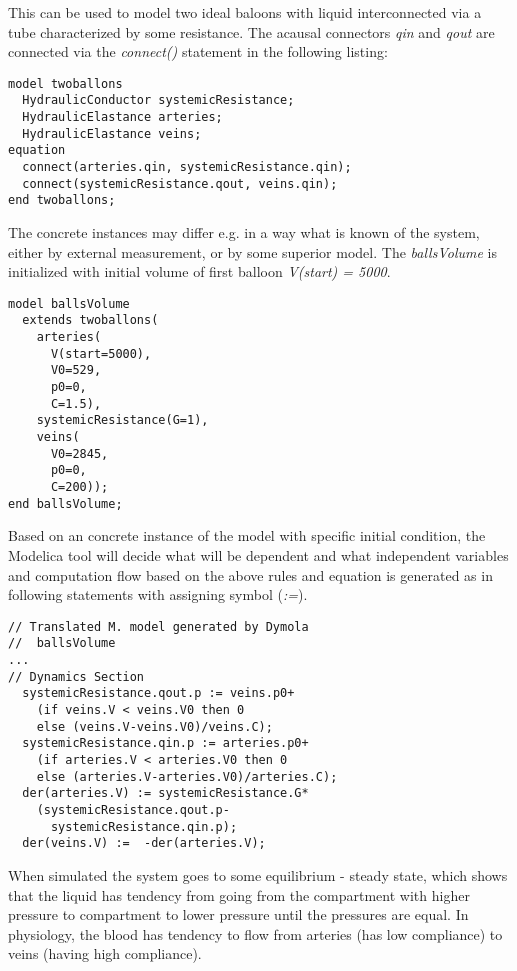 \documentclass[letterpaper, 10 pt, conference]{ieeeconf}  %
\begin{document}
This can be used to model two ideal baloons with liquid  interconnected via a tube characterized by some resistance. The acausal connectors \emph{qin} and \emph{qout} are connected via the \emph{connect()} statement in the following listing:
\begin{lstlisting}[language=modelica]
model twoballons
  HydraulicConductor systemicResistance;
  HydraulicElastance arteries;
  HydraulicElastance veins;
equation 
  connect(arteries.qin, systemicResistance.qin);
  connect(systemicResistance.qout, veins.qin);
end twoballons;
\end{lstlisting}

The concrete instances may differ e.g. in a way what is known of the system, either by external measurement, or by some superior model. The \emph{ballsVolume} is initialized with initial volume of first balloon \emph{V(start) = 5000}.

\begin{lstlisting}[language=modelica]
model ballsVolume
  extends twoballons(
    arteries(
      V(start=5000),
      V0=529,
      p0=0,
      C=1.5),
    systemicResistance(G=1),
    veins(
      V0=2845,
      p0=0,
      C=200));
end ballsVolume;
\end{lstlisting}

Based on an concrete instance of the model with specific initial condition, the Modelica tool will decide what will be dependent and  what independent variables and computation flow based on the above rules and equation is generated as in following statements with assigning symbol (\emph{:=}).
\begin{lstlisting}[language=modelica]
// Translated M. model generated by Dymola  
//  ballsVolume
...
// Dynamics Section
  systemicResistance.qout.p := veins.p0+
    (if veins.V < veins.V0 then 0 
    else (veins.V-veins.V0)/veins.C);
  systemicResistance.qin.p := arteries.p0+
    (if arteries.V < arteries.V0 then 0
    else (arteries.V-arteries.V0)/arteries.C);
  der(arteries.V) := systemicResistance.G*
    (systemicResistance.qout.p-
      systemicResistance.qin.p);
  der(veins.V) :=  -der(arteries.V);
\end{lstlisting}

When simulated the system goes to some equilibrium - steady state, which shows that the liquid has tendency from going from the compartment with higher pressure to compartment to lower pressure until the pressures are equal. In physiology, the blood has tendency to flow from arteries (has low compliance) to veins (having high compliance).
\end{document}
